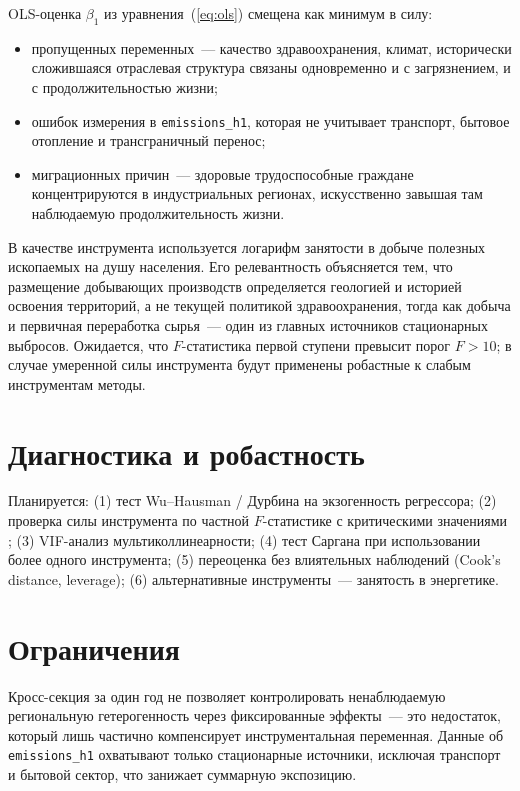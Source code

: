 \documentclass[11pt,a4paper]{article}
\begin{document}
OLS-оценка $\beta_1$ из уравнения~(\ref{eq:ols}) смещена как минимум в силу:
\begin{itemize}[leftmargin=2em]
  \item пропущенных переменных~--- качество здравоохранения, климат, исторически сложившаяся отраслевая структура связаны одновременно и с загрязнением, и с продолжительностью жизни;
  \item ошибок измерения в \texttt{emissions\_h1}, которая не учитывает транспорт, бытовое отопление и трансграничный перенос;
  \item миграционных причин~--- здоровые трудоспособные граждане концентрируются в индустриальных регионах, искусственно завышая там наблюдаемую продолжительность жизни.
\end{itemize}

В качестве инструмента используется логарифм занятости в добыче полезных ископаемых на душу населения. Его релевантность объясняется тем, что размещение добывающих производств определяется геологией и историей освоения территорий, а не текущей политикой здравоохранения, тогда как добыча и первичная переработка сырья~--- один из главных источников стационарных выбросов. Ожидается, что $F$-статистика первой ступени превысит порог \citet{staiger1997} $F > 10$; в случае умеренной силы инструмента будут применены робастные к слабым инструментам методы.

\section*{Диагностика и робастность}

Планируется: (1) тест Wu--Hausman / Дурбина на экзогенность регрессора; (2) проверка силы инструмента по частной $F$-статистике с критическими значениями \citet{stockyogo2005}; (3) VIF-анализ мультиколлинеарности; (4) тест Саргана при использовании более одного инструмента; (5) переоценка без влиятельных наблюдений (Cook's distance, leverage); (6) альтернативные инструменты~--- занятость в энергетике.

\section*{Ограничения}

Кросс-секция за один год не позволяет контролировать ненаблюдаемую региональную гетерогенность через фиксированные эффекты~--- это недостаток, который лишь частично компенсирует инструментальная переменная. Данные об \texttt{emissions\_h1} охватывают только стационарные источники, исключая транспорт и бытовой сектор, что занижает суммарную экспозицию.
\end{document}
